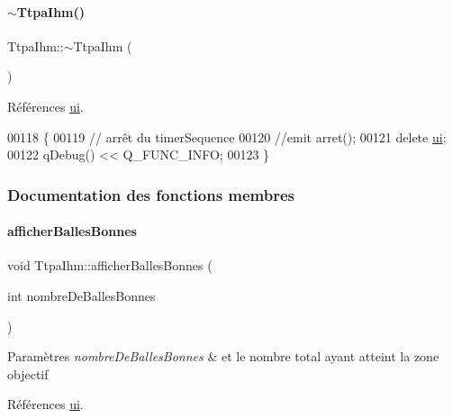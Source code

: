 \paragraph{\texorpdfstring{$\sim$\+Ttpa\+Ihm()}{~TtpaIhm()}}
{\footnotesize\ttfamily Ttpa\+Ihm\+::$\sim$\+Ttpa\+Ihm (\begin{DoxyParamCaption}{ }\end{DoxyParamCaption})}



Références \hyperlink{class_ttpa_ihm_ad5fae1222a667da158c26f3d0f0dce23}{ui}.


\begin{DoxyCode}
00118 \{
00119     \textcolor{comment}{// arrêt du timerSequence}
00120     \textcolor{comment}{//emit arret();}
00121     \textcolor{keyword}{delete} \hyperlink{class_ttpa_ihm_ad5fae1222a667da158c26f3d0f0dce23}{ui};
00122     qDebug() << Q\_FUNC\_INFO;
00123 \}
\end{DoxyCode}


\subsubsection{Documentation des fonctions membres}
\mbox{\label{class_ttpa_ihm_a92494cbd992da35c40128408fb06e9a1}} 
\paragraph{\texorpdfstring{afficher\+Balles\+Bonnes}{afficherBallesBonnes}}
{\footnotesize\ttfamily void Ttpa\+Ihm\+::afficher\+Balles\+Bonnes (\begin{DoxyParamCaption}\item[{int}]{nombre\+De\+Balles\+Bonnes }\end{DoxyParamCaption})\hspace{0.3cm}{\ttfamily [slot]}}


\begin{DoxyParams}{Paramètres}
{\em nombre\+De\+Balles\+Bonnes} & et le nombre total ayant atteint la zone objectif \\
\hline
\end{DoxyParams}


Références \hyperlink{class_ttpa_ihm_ad5fae1222a667da158c26f3d0f0dce23}{ui}.



